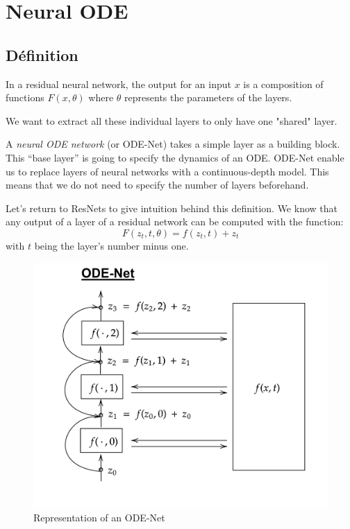 \documentclass[10pt,a4paper]{article}
\theoremstyle{definition}
\theoremstyle{definition}
\theoremstyle{definition}
\begin{document}
\section{Neural ODE}

\subsection{Définition}


In a residual neural network, the output for an input $x$ is a composition of functions $F(x, \theta)$ where $\theta$ represents the parameters of the layers. 

We want to extract all these individual layers to only have one "shared" layer.

A \textit{neural ODE network} (or ODE-Net) takes a simple layer as a building block. This “base layer” is going to specify the dynamics of an ODE.
ODE-Net enable us to replace layers of neural networks with a continuous-depth model. This means that we do not need to specify the number of layers beforehand.

Let's return to ResNets to give intuition behind this definition.
We know that any output of a layer of a residual network can be computed with the function:
$$F(z_t, t, \theta) = f(z_t, t) + z_t$$
with $t$ being the layer's number minus one.

\begin{figure}
\center
\includegraphics[scale=0.18]{ODENet.png}
\caption{Representation of an ODE-Net}
\end{figure}
\end{document}
